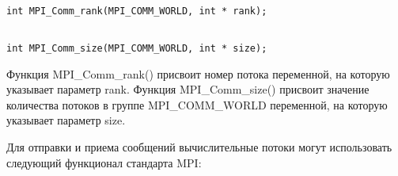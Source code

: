\begin{lstlisting}

int MPI_Comm_rank(MPI_COMM_WORLD, int * rank);

\end{lstlisting}
\mylistingend

\begin{lstlisting}

int MPI_Comm_size(MPI_COMM_WORLD, int * size);

\end{lstlisting}
\mylistingend

Функция MPI\_Comm\_rank() присвоит номер потока переменной, на которую указывает параметр rank. Функция MPI\_Comm\_size() присвоит значение количества потоков в группе MPI\_COMM\_WORLD переменной, на которую указывает параметр size.

Для отправки и приема сообщений вычислительные потоки могут использовать следующий функционал стандарта MPI:

